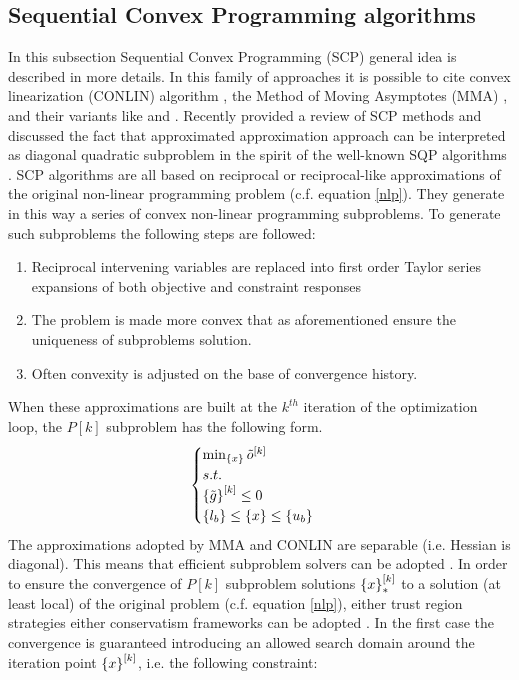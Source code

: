 \subsection{Sequential Convex Programming algorithms}
In this subsection Sequential Convex Programming (SCP) \cite{fleury1993mathematical,zillober2004very,duysinx2009solution} general idea is described in more details. In this family of approaches it is possible to cite convex linearization (CONLIN) algorithm \cite{fleury1986structural}, the Method of Moving Asymptotes (MMA) \cite{svanberg1987method,svanberg2002class}, and their variants like \cite{borrvall2001large,bruyneel2002family} and \cite{zillober2004very}.
Recently \cite{etman2012first} provided a review of SCP methods and discussed the fact that approximated approximation approach \cite{groenwold2010approximated} can be interpreted as diagonal quadratic subproblem in the spirit of the well-known SQP algorithms \cite{nocedal2006sequential}.
SCP algorithms are all based on reciprocal or reciprocal-like approximations of the original non-linear programming problem (c.f. equation \eqref{nlp}). They generate in this way  a series of convex non-linear programming subproblems. To generate such subproblems the following steps are followed:
\begin{enumerate}
\item Reciprocal intervening variables are replaced into first order Taylor series expansions of both objective and constraint responses 
\item The problem is made more convex that as aforementioned ensure the uniqueness of subproblems solution.
\item Often convexity is adjusted on the base of convergence history.
\end{enumerate}
When these approximations are built at the $k^{th}$ iteration of the optimization loop, the $P[k]$ subproblem has the following form.
\begin{equation}
\begin{cases}
\min_{\left\lbrace{x}\right \rbrace} \tilde{o}^{[k]}\\
s.t.\\
\left\lbrace{\tilde{g}}\right \rbrace^{[k]}\leq 0\\
\left\lbrace{l_b}\right \rbrace\leq \left\lbrace{x}\right \rbrace\leq \left\lbrace{u_b}\right \rbrace
\end{cases}
\end{equation}
The approximations adopted by MMA and CONLIN are separable (i.e. Hessian is diagonal). This means that efficient subproblem solvers can be adopted \cite{falk1967lagrange,fleury1979structural}. In order to ensure the convergence of $P[k]$ subproblem solutions $\left\lbrace{x}\right \rbrace^{[k]}_*$ to a solution (at least local) of the original problem (c.f. equation \ref{nlp}), either trust region \cite{alexandrov1998trust} strategies either conservatism frameworks \cite{svanberg2002class} can be adopted \cite{etman2012first}. In the first case the convergence is guaranteed introducing an allowed search domain around the iteration point $\left\lbrace{x}\right \rbrace^{[k]}$, i.e. the following constraint: 
